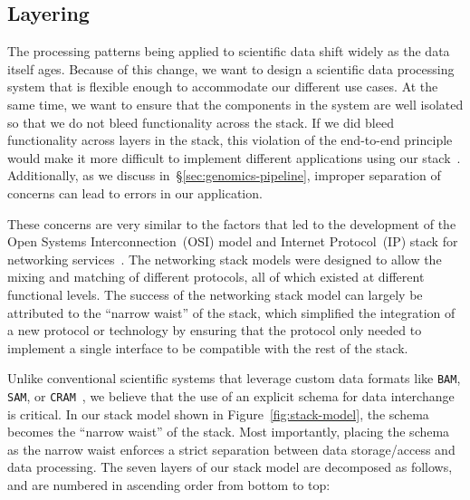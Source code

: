 \documentclass{sig-alternate}
\begin{document}
\subsection{Layering}
\label{sec:layering}

The processing patterns being applied to scientific data shift widely
as the data itself ages. Because of this change, we want to design a scientific data processing system that is
flexible enough to accommodate our different use cases. At the same time, we want to ensure that the
components in the system are well isolated so that we do not bleed functionality across the stack. If
we did bleed functionality across layers in the stack, this violation of the end-to-end principle would make it more
difficult to implement different applications using our stack~\cite{saltzer84}. Additionally, as we discuss
in~\S\ref{sec:genomics-pipeline}, improper separation of concerns can lead to errors in our application.

These concerns are very similar to the factors that led to the development of the Open Systems
Interconnection~(OSI) model and Internet Protocol~(IP) stack for networking
services~\cite{zimmermann80}. The networking stack models were designed to allow the mixing and
matching of different protocols, all of which existed at different functional levels. The success of the
networking stack model can largely be attributed to the ``narrow waist'' of the stack, which simplified the
integration of a new protocol or technology by ensuring that the protocol only needed to implement a
single interface to be compatible with the rest of the stack.

Unlike conventional scientific systems that leverage custom data formats like \texttt{BAM}, \texttt{SAM},
or \texttt{CRAM}~\cite{fritz11, li09}, we believe that the use of an explicit schema for data interchange is critical.
In our stack model shown in Figure~\ref{fig:stack-model}, the schema becomes the ``narrow waist''
of the stack. Most importantly, placing the schema as the narrow waist enforces a strict separation
between data storage/access and data processing. The seven layers of our stack model
are decomposed as follows, and are numbered in ascending order from bottom to top:
\end{document}
